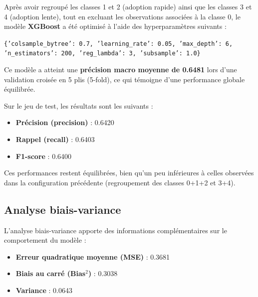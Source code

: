 \documentclass[a4paper,12pt]{article}
\begin{document}
Après avoir regroupé les classes 1 et 2 (adoption rapide) ainsi que les classes 3 et 4 (adoption lente), tout en excluant les observations associées à la classe 0, le modèle \textbf{XGBoost} a été optimisé à l’aide des hyperparamètres suivants :
 
\begin{center}

\texttt{\{'colsample\_bytree': 0.7, 'learning\_rate': 0.05, 'max\_depth': 6, 'n\_estimators': 200, 'reg\_lambda': 3, 'subsample': 1.0\}}

\end{center}
 
Ce modèle a atteint une \textbf{précision macro moyenne de 0.6481} lors d'une validation croisée en 5 plis (5-fold), ce qui témoigne d'une performance globale équilibrée.
 
\medskip
 
Sur le jeu de test, les résultats sont les suivants :

\begin{itemize}

    \item \textbf{Précision (precision)} : 0.6420

    \item \textbf{Rappel (recall)} : 0.6403

    \item \textbf{F1-score} : 0.6400

\end{itemize}
 
Ces performances restent équilibrées, bien qu’un peu inférieures à celles observées dans la configuration précédente (regroupement des classes 0+1+2 et 3+4).
 
\subsection*{Analyse biais-variance}
 
L’analyse biais-variance apporte des informations complémentaires sur le comportement du modèle :
 
\begin{itemize}

    \item \textbf{Erreur quadratique moyenne (MSE)} : 0.3681

    \item \textbf{Biais au carré (Bias$^2$)} : 0.3038

    \item \textbf{Variance} :  0.0643

\end{itemize}
 
\end{document}
